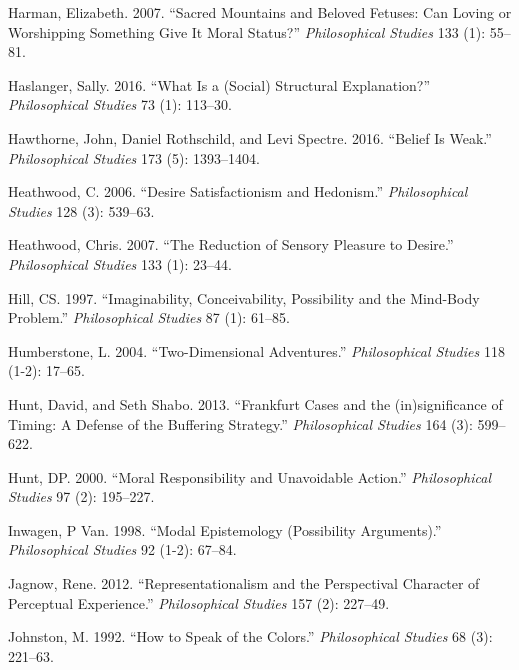 \documentclass[
  10pt,
  letterpaper,
  DIV=11,
  numbers=noendperiod,
  twoside]{scrartcl}
\newlength{\cslhangindent}
\newenvironment{CSLReferences}[2] %
 {\begin{list}{}{%
  \setlength{\itemindent}{0pt}
  \setlength{\leftmargin}{0pt}
  \setlength{\parsep}{0pt}
  \ifodd #1
   \setlength{\leftmargin}{\cslhangindent}
   \setlength{\itemindent}{-1\cslhangindent}
  \fi
  \setlength{\itemsep}{#2\baselineskip}}}
 {\end{list}}
\begin{document}
\begin{CSLReferences}{1}{0}
Harman, Elizabeth. 2007. {``Sacred Mountains and Beloved Fetuses: Can
Loving or Worshipping Something Give It Moral Status?''}
\emph{Philosophical Studies} 133 (1): 55--81.

Haslanger, Sally. 2016. {``What Is a (Social) Structural Explanation?''}
\emph{Philosophical Studies} 73 (1): 113--30.

Hawthorne, John, Daniel Rothschild, and Levi Spectre. 2016. {``Belief Is
Weak.''} \emph{Philosophical Studies} 173 (5): 1393--1404.

Heathwood, C. 2006. {``Desire Satisfactionism and Hedonism.''}
\emph{Philosophical Studies} 128 (3): 539--63.

Heathwood, Chris. 2007. {``The Reduction of Sensory Pleasure to
Desire.''} \emph{Philosophical Studies} 133 (1): 23--44.

Hill, CS. 1997. {``Imaginability, Conceivability, Possibility and the
Mind-Body Problem.''} \emph{Philosophical Studies} 87 (1): 61--85.

Humberstone, L. 2004. {``Two-Dimensional Adventures.''}
\emph{Philosophical Studies} 118 (1-2): 17--65.

Hunt, David, and Seth Shabo. 2013. {``Frankfurt Cases and the
(in)significance of Timing: A Defense of the Buffering Strategy.''}
\emph{Philosophical Studies} 164 (3): 599--622.

Hunt, DP. 2000. {``Moral Responsibility and Unavoidable Action.''}
\emph{Philosophical Studies} 97 (2): 195--227.

Inwagen, P Van. 1998. {``Modal Epistemology (Possibility Arguments).''}
\emph{Philosophical Studies} 92 (1-2): 67--84.

Jagnow, Rene. 2012. {``Representationalism and the Perspectival
Character of Perceptual Experience.''} \emph{Philosophical Studies} 157
(2): 227--49.

Johnston, M. 1992. {``How to Speak of the Colors.''} \emph{Philosophical
Studies} 68 (3): 221--63.


\end{CSLReferences}
\end{document}
